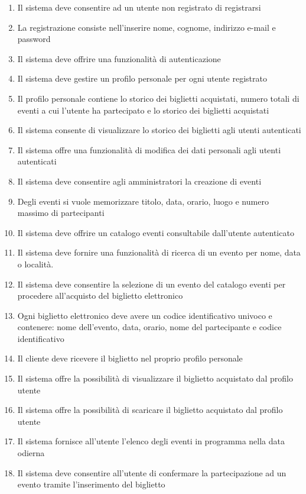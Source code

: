 \begin{enumerate}[]
    \item Il sistema deve consentire ad un utente non registrato di registrarsi
    \item La registrazione consiste nell’inserire nome, cognome, indirizzo e-mail e password
    \item Il sistema deve offrire una funzionalità di autenticazione
    \item Il sistema deve gestire un profilo personale per ogni utente registrato
    \item Il profilo personale contiene lo storico dei biglietti acquistati, numero totali di eventi a cui l’utente ha partecipato e lo storico dei biglietti acquistati
    \item Il sistema consente di visualizzare lo storico dei biglietti agli utenti autenticati
    \item Il sistema offre una funzionalità di modifica dei dati personali agli utenti autenticati
    \item Il sistema deve consentire agli amministratori la creazione di eventi
    \item Degli eventi si vuole memorizzare titolo, data, orario, luogo e numero massimo di partecipanti
    \item Il sistema deve offrire un catalogo eventi consultabile dall'utente autenticato
    \item Il sistema deve fornire una funzionalità di ricerca di un evento per nome, data o località.
    \item Il sistema deve consentire la selezione di un evento del catalogo eventi per procedere all’acquisto del biglietto elettronico
    \item Ogni biglietto elettronico deve avere un codice identificativo univoco e contenere: nome dell’evento, data, orario, nome del partecipante e codice identificativo
    \item Il cliente deve ricevere il biglietto nel proprio profilo personale
    \item Il sistema offre la possibilità di visualizzare il biglietto acquistato dal profilo utente
    \item Il sistema offre la possibilità di scaricare il biglietto acquistato dal profilo utente
    \item Il sistema fornisce all’utente l’elenco degli eventi in programma nella data odierna
    \item Il sistema deve consentire all’utente di confermare la partecipazione ad un evento tramite l’inserimento del biglietto

\end{enumerate}
